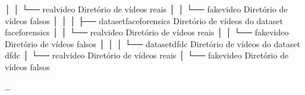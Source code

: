 \documentclass[letterpaper,10pt,brazil]{sphinxmanual}
\begin{document}
\begin{sphinxVerbatim}[commandchars=\\\{\}]
│       │   └── real\PYGZus{}video          \PYGZlt{}\PYGZhy{} Diretório de vídeos reais
│       │   └── fake\PYGZus{}video          \PYGZlt{}\PYGZhy{} Diretório de vídeos falsos
│       │
│       ├── dataset\PYGZus{}faceforensics   \PYGZlt{}\PYGZhy{} Diretório de vídeos do dataset faceforensics
│       │   └── real\PYGZus{}video          \PYGZlt{}\PYGZhy{} Diretório de vídeos reais
│       │   └── fake\PYGZus{}video          \PYGZlt{}\PYGZhy{} Diretório de vídeos falsos
│       │
│       └── dataset\PYGZus{}dfdc            \PYGZlt{}\PYGZhy{} Diretório de vídeos do dataset dfdc
│           └── real\PYGZus{}video          \PYGZlt{}\PYGZhy{} Diretório de vídeos reais
│           └── fake\PYGZus{}video          \PYGZlt{}\PYGZhy{} Diretório de vídeos falsos
\end{sphinxVerbatim}

\sphinxAtStartPar
…
\end{document}
